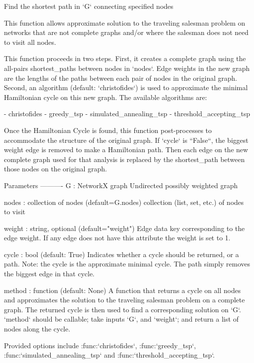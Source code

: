 \begin{DoxyVerb}Find the shortest path in `G` connecting specified nodes

This function allows approximate solution to the traveling salesman
problem on networks that are not complete graphs and/or where the
salesman does not need to visit all nodes.

This function proceeds in two steps. First, it creates a complete
graph using the all-pairs shortest_paths between nodes in `nodes`.
Edge weights in the new graph are the lengths of the paths
between each pair of nodes in the original graph.
Second, an algorithm (default: `christofides`) is used to approximate
the minimal Hamiltonian cycle on this new graph. The available
algorithms are:

 - christofides
 - greedy_tsp
 - simulated_annealing_tsp
 - threshold_accepting_tsp

Once the Hamiltonian Cycle is found, this function post-processes to
accommodate the structure of the original graph. If `cycle` is ``False``,
the biggest weight edge is removed to make a Hamiltonian path.
Then each edge on the new complete graph used for that analysis is
replaced by the shortest_path between those nodes on the original graph.

Parameters
----------
G : NetworkX graph
    Undirected possibly weighted graph

nodes : collection of nodes (default=G.nodes)
    collection (list, set, etc.) of nodes to visit

weight : string, optional (default="weight")
    Edge data key corresponding to the edge weight.
    If any edge does not have this attribute the weight is set to 1.

cycle : bool (default: True)
    Indicates whether a cycle should be returned, or a path.
    Note: the cycle is the approximate minimal cycle.
    The path simply removes the biggest edge in that cycle.

method : function (default: None)
    A function that returns a cycle on all nodes and approximates
    the solution to the traveling salesman problem on a complete
    graph. The returned cycle is then used to find a corresponding
    solution on `G`. `method` should be callable; take inputs
    `G`, and `weight`; and return a list of nodes along the cycle.

    Provided options include :func:`christofides`, :func:`greedy_tsp`,
    :func:`simulated_annealing_tsp` and :func:`threshold_accepting_tsp`.


\end{DoxyVerb}

